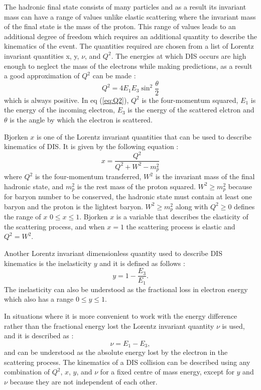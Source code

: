 \documentclass[journal, a4paper,11pt]{IEEEtran}
\begin{document}
The hadronic final state consists of many particles and as a result its invariant mass can have a range of values unlike elastic scattering where the invariant mass of the final state is the mass of the proton. This range of values leads to an additional degree of freedom which requires an additional quantity to describe the kinematics of the event. The quantities required are chosen from a list of Lorentz invariant quantities x, y, $\nu$, and $Q^2$. 
The energies at which DIS occurs are high enough to neglect the mass of the electrons while making predictions, as a result a good approximation of $Q^2$ can be made \cite{Modern}:
\begin{equation}
	Q^2 = 4E_1E_3 \sin ^2\frac{\theta}{2}
	\label{eq:Q2}
\end{equation}
which is always positive. In eq (\ref{eq:Q2}), $Q^2$ is the four-momentum squared, $E_1$ is the energy of the incoming electron, $E_3$ is the energy of the scattered elctron and $\theta$ is the angle by which the electron is scattered.

Bjorken $x$ is one of the Lorentz invariant quantities that can be used to describe kinematics of DIS. It is given by the following equation \cite{Modern}: 
\begin{equation}
	x = \frac{Q^2}{Q^2 + W^2 - m_p^2}
	\label{eq:x}
\end{equation}
where $Q^2$ is the four-momentum transferred, $W^2$ is the invariant mass of the final hadronic state, and $m_p^2$ is the rest mass of the proton squared. $W^2 \geq m_p^2$ because for baryon number to be conserved, the hadronic state must contain at least one baryon and the proton is the lightest baryon. $W^2 \geq m_p^2$ along with $Q^2 \geq 0$ defines the range of $x$ $0 \leq x \leq 1$. Bjorken $x$ is a variable that describes the elasticity of the scattering process, and when $x = 1$ the scattering process is elastic and $Q^2 = W^2$.

Another Lorentz invariant dimensionless quantity used to describe DIS kinematics is the inelasticity $y$ and it is defined as follows \cite{Modern}:
\begin{equation}
	y = 1-\frac{E_3}{E_1}.
	\label{eq:y}
\end{equation}
The inelasticity can also be understood as the fractional loss in electron energy which also has a range $0 \leq y \leq 1$.

In situations where it is more convenient to work with the energy difference rather than the fractional energy lost the Lorentz invariant quantity $\nu$ is used, and it is described as \cite{Modern}:
\begin{equation}
	\nu = E_1 - E_3,
	\label{eq:nu}
\end{equation}
and can be understood as the absolute energy lost by the electron in the scattering process.
The kinematics of a DIS collision can be described using any combination of $Q^2$, $x$, $y$, and $\nu$ for a fixed centre of mass energy, except for $y$ and $\nu$ because they are not independent of each other.
\end{document}
